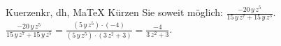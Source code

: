 \begin{MAufgabe}{Kuerzen}{kr, dh, MaTeX}
K\"urzen Sie soweit m\"oglich: $\frac{- 20\, y\, z^5}{15\, y\, z^7 + 15\, y\, z^5}$.\\ 
\ifLsg\MLoesung
\quad $\frac{- 20\, y\, z^5}{15\, y\, z^7 + 15\, y\, z^5}=\frac{(5\, y\, z^5)\cdot(-4)}{(5\, y\, z^5)\cdot(3\, z^2 + 3)}=\frac{-4}{3\, z^2 + 3}$.\else\relax\fi
 \end{MAufgabe}